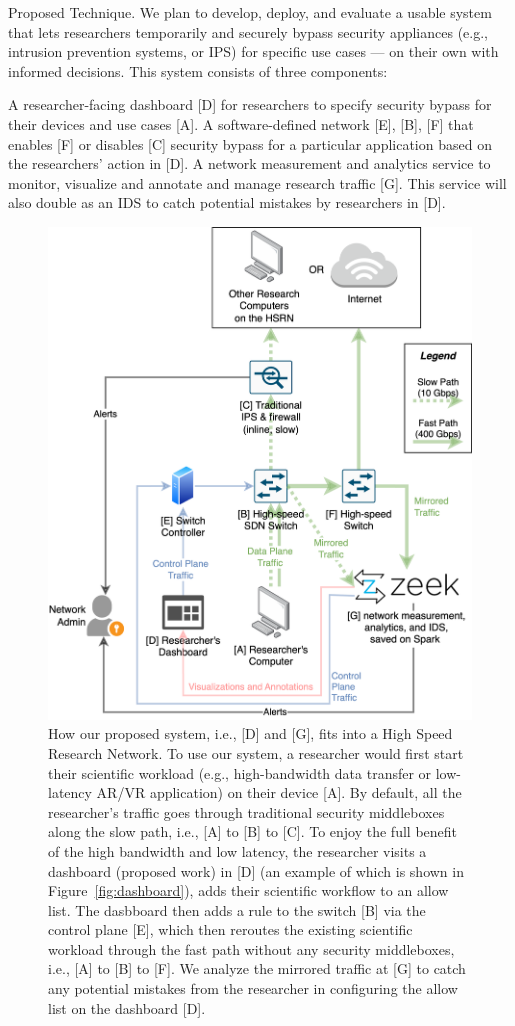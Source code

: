 Proposed Technique. We plan to develop, deploy, and evaluate a usable system that lets researchers temporarily and securely bypass security appliances (e.g., intrusion prevention systems, or IPS) for specific use cases — on their own with informed decisions. This system consists of three components:

A researcher-facing dashboard [D] for researchers to specify security bypass for their devices and use cases [A].
A software-defined network [E], [B], [F] that enables [F] or disables [C] security bypass for a particular application based on the researchers' action in [D].
A network measurement and analytics service to monitor, visualize and annotate and manage research traffic [G]. This service will also double as an IDS to catch potential mistakes by researchers in [D].

\begin{figure}[t]
    \centering
    \includegraphics[width=0.6\linewidth]{figures/system.png}
    \caption{How our proposed system, i.e., [D] and [G], fits into a High Speed Research Network. To use our system, a researcher would first start their scientific workload (e.g., high-bandwidth data transfer or low-latency AR/VR application) on their device [A]. By default, all the researcher's traffic goes through traditional security middleboxes along the slow path, i.e., [A] to [B] to [C]. To enjoy the full benefit of the high bandwidth and low latency, the researcher visits a dashboard (proposed work) in [D] (an example of which is shown in Figure~\ref{fig:dashboard}), adds their scientific workflow to an allow list. The dasbboard then adds a rule to the switch [B] via the control plane [E], which then reroutes the existing scientific workload through the fast path without any security middleboxes, i.e., [A] to [B] to [F]. We analyze the mirrored traffic at [G] to catch any potential mistakes from the researcher in configuring the allow list on the dashboard [D].}
    \label{fig:system}
\end{figure}


